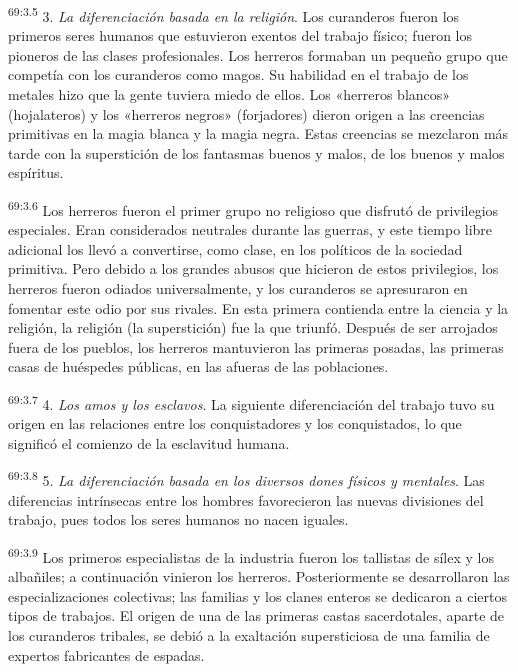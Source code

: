 \par
\textsuperscript{69:3.5} 3. \textit{La diferenciación basada en la religión}. Los curanderos fueron los primeros seres humanos que estuvieron exentos del trabajo físico; fueron los pioneros de las clases profesionales. Los herreros formaban un pequeño grupo que competía con los curanderos como magos. Su habilidad en el trabajo de los metales hizo que la gente tuviera miedo de ellos. Los «herreros blancos» (hojalateros) y los «herreros negros» (forjadores) dieron origen a las creencias primitivas en la magia blanca y la magia negra. Estas creencias se mezclaron más tarde con la superstición de los fantasmas buenos y malos, de los buenos y malos espíritus.

\par
\textsuperscript{69:3.6} Los herreros fueron el primer grupo no religioso que disfrutó de privilegios especiales. Eran considerados neutrales durante las guerras, y este tiempo libre adicional los llevó a convertirse, como clase, en los políticos de la sociedad primitiva. Pero debido a los grandes abusos que hicieron de estos privilegios, los herreros fueron odiados universalmente, y los curanderos se apresuraron en fomentar este odio por sus rivales. En esta primera contienda entre la ciencia y la religión, la religión (la superstición) fue la que triunfó. Después de ser arrojados fuera de los pueblos, los herreros mantuvieron las primeras posadas, las primeras casas de huéspedes públicas, en las afueras de las poblaciones.

\par
\textsuperscript{69:3.7} 4. \textit{Los amos y los esclavos}. La siguiente diferenciación del trabajo tuvo su origen en las relaciones entre los conquistadores y los conquistados, lo que significó el comienzo de la esclavitud humana.

\par
\textsuperscript{69:3.8} 5. \textit{La diferenciación basada en los diversos dones físicos y mentales}. Las diferencias intrínsecas entre los hombres favorecieron las nuevas divisiones del trabajo, pues todos los seres humanos no nacen iguales.

\par
\textsuperscript{69:3.9} Los primeros especialistas de la industria fueron los tallistas de sílex y los albañiles; a continuación vinieron los herreros. Posteriormente se desarrollaron las especializaciones colectivas; las familias y los clanes enteros se dedicaron a ciertos tipos de trabajos. El origen de una de las primeras castas sacerdotales, aparte de los curanderos tribales, se debió a la exaltación supersticiosa de una familia de expertos fabricantes de espadas.

